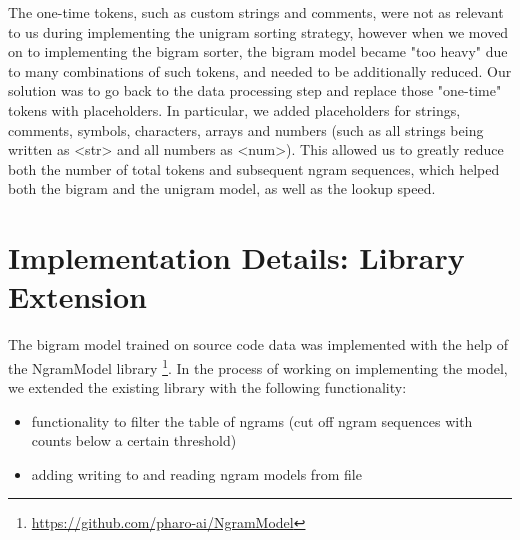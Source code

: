 The one-time tokens, such as custom strings and comments, were not as relevant to us during implementing the unigram sorting strategy, however when we moved on to implementing the bigram sorter, the bigram model became "too heavy" due to many combinations of such tokens, and needed to be additionally reduced. Our solution was to go back to the data processing step and replace those "one-time" tokens with placeholders. In particular, we added placeholders for strings, comments, symbols, characters, arrays and numbers (such as all strings being written as <str> and all numbers as <num>). This allowed us to greatly reduce both the number of total tokens and subsequent ngram sequences, which helped both the bigram and the unigram model, as well as the lookup speed.

\section{Implementation Details: Library Extension}
\label{sec:ProposedSolution-LibraryExtension}
The bigram model trained on source code data was implemented with the help of the NgramModel library \footnote{\url{https://github.com/pharo-ai/NgramModel}}. In the process of working on implementing the model, we extended the existing library with the following functionality:
\begin{itemize}
    \item functionality to filter the table of ngrams (cut off ngram sequences with counts below a certain threshold)
    \item adding writing to and reading ngram models from file
\end{itemize}

